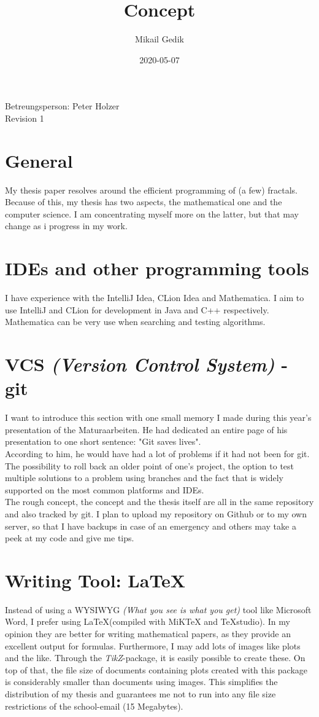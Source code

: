 \documentclass[10pt,a4paper]{article}
\title{Concept}
\author{Mikail Gedik}
\date{2020-05-07}
\begin{document}
	\maketitle
	\begin{center}
		Betreungsperson: Peter Holzer\\
		Revision 1
	\end{center}
	\tableofcontents
	\newpage
	
	\section{General}
	My thesis paper resolves around the efficient programming of (a few) fractals. Because of this, my thesis has two aspects, the mathematical one and the computer science. I am concentrating myself more on the latter, but that may change as i progress in my work.
	\section{IDEs and other programming tools}
	I have experience with the IntelliJ Idea, CLion Idea and Mathematica. I aim to use IntelliJ and CLion for development in Java and C++ respectively. Mathematica can be very use when searching and testing algorithms.
	\section{VCS \textit{(Version Control System)} - git}
	I want to introduce this section with one small memory I made during this year's presentation of the Maturaarbeiten. He had dedicated an entire page of his presentation to one short sentence: "Git saves lives".\\
	According to him, he would have had a lot of problems if it had not been for git. The possibility to roll back an older point of one's project, the option to test multiple solutions to a problem using branches and the fact that is widely supported on the most common platforms and IDEs.\\
	The rough concept, the concept and the thesis itself are all in the same repository and also tracked by git. I plan to upload my repository on Github or to my own server, so that I have backups in case of an emergency and others may take a peek at my code and give me tips.
	\section{Writing Tool: \LaTeX}
	Instead of using a WYSIWYG \textit{(What you see is what you get)} tool like Microsoft Word, I prefer using \LaTeX(compiled with MiKTeX and TeXstudio). In my opinion they are better for writing mathematical papers, as they provide an excellent output for formulas. Furthermore, I may add lots of images like plots and the like. Through the \textit{TikZ}-package, it is easily possible to create these. On top of that, the file size of documents containing plots created with this package is considerably smaller than documents using images. This simplifies the distribution of my thesis and guarantees me not to run into any file size restrictions of the school-email (15 Megabytes).
\end{document}
